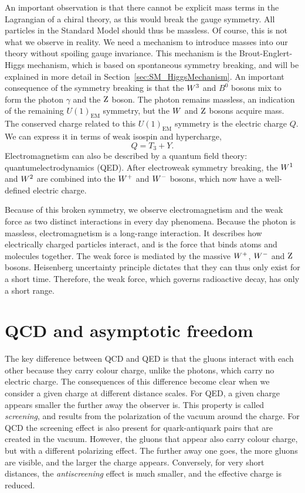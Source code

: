 An important observation is that there cannot be explicit mass terms in the Lagrangian of a chiral
theory, as this would break the gauge symmetry. All particles in the Standard Model should thus be
massless.
Of course, this is not what we observe in reality. 
We need a mechanism to introduce masses into our theory without spoiling gauge
invariance. This mechanism is the Brout-Englert-Higgs mechanism, which is based on spontaneous
symmetry breaking, and will be explained in more detail in Section~\ref{sec:SM_HiggsMechanism}.
An important consequence of the symmetry breaking is that the $W^3$ and $B^0$ bosons mix to
form the photon $\gamma$ and the $\mathrm{Z}$ boson. 
The photon remains massless, an indication of the remaining $U(1)_{\text{EM}}$ symmetry,
but the $W$ and $\mathrm{Z}$ bosons acquire mass. 
The conserved charge related to this $U(1)_{\text{EM}}$ symmetry is the electric charge $Q$. We can
express it in terms of weak isospin and hypercharge,
\begin{equation}
  Q = T_3 + Y .
\end{equation}
Electromagnetism can also be described by a quantum field theory: quantumelectrodynamics (QED).
After electroweak symmetry breaking, the $W^1$ and $W^2$ are combined into the $W^+$ and $W^-$
bosons, which now have a well-defined electric charge. 

Because of this broken symmetry, we observe electromagnetism and the weak force as two distinct
interactions in every day phenomena. 
Because the photon is massless, electromagnetism is a long-range interaction. It describes how
electrically charged particles interact, and is the force that binds atoms and molecules together.
The weak force is mediated by the massive $W^+$, $W^-$ and $\mathrm{Z}$ bosons.
Heisenberg uncertainty principle dictates that they can thus only exist for a short time. Therefore,
the weak force, which governs radioactive decay, has only a short range.



\section{QCD and asymptotic freedom \label{sec:SM_QCD}}

The key difference between QCD and QED is that the gluons interact with each other because they
carry colour charge, unlike the photons, which carry no electric charge. The consequences of this
difference become clear when we consider a given charge at different distance scales. For QED, a
given charge appears smaller the further away the observer is. This property is called
\textit{screening}, and results from the polarization of the vacuum around the charge. 
For QCD the screening effect is also present for quark-antiquark pairs that are created in the
vacuum. However, the gluons that appear also carry colour charge, but with a different polarizing
effect. The further away one goes, the more gluons are visible, and the larger the charge appears.
Conversely, for very short distances, the \textit{antiscreening} effect is much smaller, and the
effective charge is reduced. 

